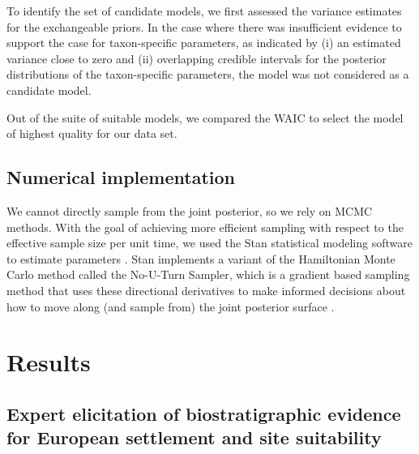 \documentclass[12pt]{article}
\begin{document}
To identify the set of candidate models, we first assessed the
variance estimates for the exchangeable priors. In the case where
there was insufficient evidence to support the case for taxon-specific
parameters, as indicated by (i) an estimated variance close to zero
and (ii) overlapping credible intervals for the posterior
distributions of the taxon-specific parameters, the model was not
considered as a candidate model.

Out of the suite of suitable models, we compared the WAIC to select the
model of highest quality for our data set.

\subsection{Numerical implementation}

We cannot directly sample from the joint posterior, so we rely on MCMC
methods. With the goal of achieving more efficient sampling with
respect to the effective sample size per unit time, we used the Stan
statistical modeling software to estimate parameters
\cite{stan-software:2014}. Stan implements a variant of the
Hamiltonian Monte Carlo method called the No-U-Turn Sampler, which is
a gradient based sampling method that uses these directional
derivatives to make informed decisions about how to move along (and
sample from) the joint posterior surface \cite{hoffman2011nuts}.



\section{Results}

\subsection{Expert elicitation of biostratigraphic evidence for European settlement and site suitability}
\end{document}
